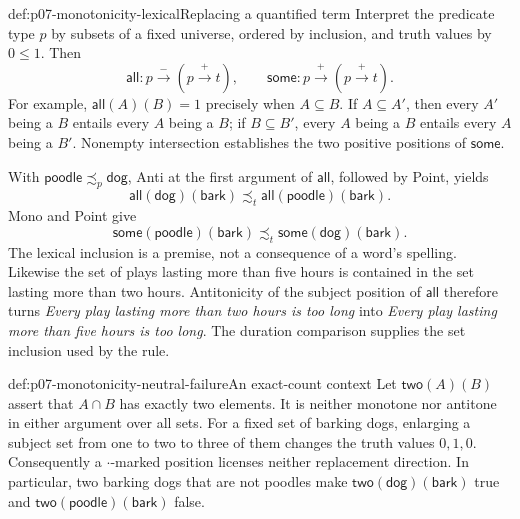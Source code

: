 \begin{hbexample}{def:p07-monotonicity-lexical}{Replacing a quantified term}
Interpret the predicate type \(p\) by subsets of a fixed universe, ordered
by inclusion, and truth values by \(0\leq1\).
Then
\[
 \mathsf{all}:p\xrightarrow-(p\xrightarrow+t),\qquad
 \mathsf{some}:p\xrightarrow+(p\xrightarrow+t).
\]
For example, \(\mathsf{all}(A)(B)=1\) precisely when \(A\subseteq B\).
If \(A\subseteq A'\), then every \(A'\) being a \(B\) entails every \(A\)
being a \(B\); if \(B\subseteq B'\), every \(A\) being a \(B\) entails
every \(A\) being a \(B'\). Nonempty intersection establishes the two
positive positions of \(\mathsf{some}\).

With \(\mathsf{poodle}\precsim_p\mathsf{dog}\), Anti at the first
argument of \(\mathsf{all}\), followed by Point, yields
\[
 \mathsf{all}(\mathsf{dog})(\mathsf{bark})
 \precsim_t
 \mathsf{all}(\mathsf{poodle})(\mathsf{bark}).
\]
Mono and Point give
\[
 \mathsf{some}(\mathsf{poodle})(\mathsf{bark})
 \precsim_t
 \mathsf{some}(\mathsf{dog})(\mathsf{bark}).
\]
The lexical inclusion is a premise, not a consequence of a word's spelling.
Likewise the set of plays lasting more than five hours is contained in the
set lasting more than two hours. Antitonicity of the subject position of
\(\mathsf{all}\) therefore turns \emph{Every play lasting more than two hours
is too long} into \emph{Every play lasting more than five hours is too long}.
The duration comparison supplies the set inclusion used by the rule.
\end{hbexample}

\begin{hbexample}{def:p07-monotonicity-neutral-failure}{An exact-count context}
Let \(\mathsf{two}(A)(B)\) assert that \(A\cap B\) has exactly two
elements. It is neither monotone nor antitone in either argument over all
sets. For a fixed set of barking dogs, enlarging a subject set from one to
two to three of them changes the truth values \(0,1,0\).
Consequently a \(\cdot\)-marked position licenses neither replacement
direction. In particular, two barking dogs that are not poodles make
\(\mathsf{two}(\mathsf{dog})(\mathsf{bark})\) true and
\(\mathsf{two}(\mathsf{poodle})(\mathsf{bark})\) false.
\end{hbexample}

